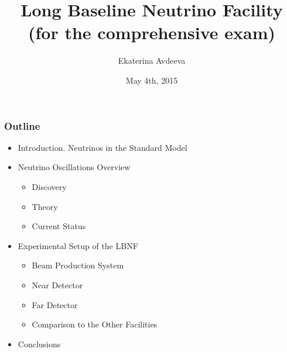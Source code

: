 \documentclass{beamer}
\title{Long Baseline Neutrino Facility \\ (for the comprehensive exam)}
\author{Ekaterina Avdeeva}
\institute{University of Nebraska - Lincoln}
\date{May 4th, 2015}
\begin{document}
\begin{frame}
\titlepage
\end{frame}

\begin{frame}
  \frametitle{Outline}
  \scriptsize
  \begin{itemize}
    \scriptsize
    \item Introduction. Neutrinos in the Standard Model
    \item Neutrino Oscillations Overview
      \begin{itemize}
         \scriptsize
         \item Discovery
         \item Theory
         \item Current Status
      \end{itemize}   
    \scriptsize
    \item Experimental Setup of the LBNF
      \begin{itemize}
         \scriptsize
         \item Beam Production System
         \item Near Detector
         \item Far Detector
         \item Comparison to the Other Facilities
      \end{itemize}  
    \scriptsize 
    \item Conclusions
  \end{itemize}
\end{frame}





\end{document}
